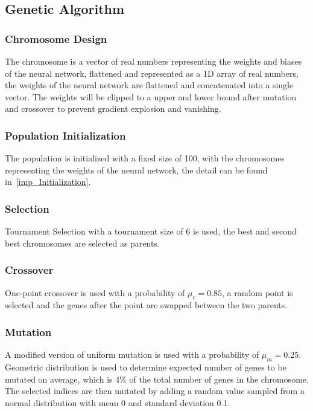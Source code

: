 \documentclass[sigconf]{acmart}
\begin{document}
\subsection{Genetic Algorithm}
\subsubsection{Chromosome Design} The chromosome is a vector of real numbers representing the weights and biases of the neural network, flattened and represented as a 1D array of real numbers, the weights of the neural network are flattened and concatenated into a single vector. The weights will be clipped to a upper and lower bound after mutation and crossover to prevent gradient explosion and vanishing.

\subsubsection{Population Initialization} The population is initialized with a fixed size of 100, with the chromosomes representing the weights of the neural network, the detail can be found in~\ref{imp_Initialization}. 
\subsubsection{Selection} Tournament Selection with a tournament size of 6 is used, the best and second best chromosomes are selected as parents.
\subsubsection{Crossover} One-point crossover is used with a probability of $\mu_c = 0.85$, a random point is selected and the genes after the point are swapped between the two parents.
\subsubsection{Mutation} A modified version of uniform mutation is used with a probability of $\mu_m = 0.25$. Geometric distribution is used to determine expected number of genes to be mutated on average, which is 4\% of the total number of genes in the chromosome. The selected indices are then mutated by adding a random value sampled from a normal distribution with mean 0 and standard deviation 0.1. 
\end{document}
